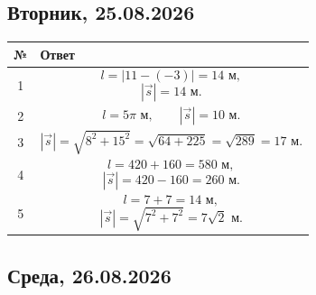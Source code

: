 \documentclass[a4paper,12pt]{article}
\begin{document}

\subsection*{\textcolor{darkaccent}{Вторник, 25.08.2026}}

\begin{center}
\renewcommand{\arraystretch}{1.35}

\begin{tabularx}{\linewidth}{@{}cX@{}}
\toprule
№ & Ответ\\
\midrule

1 &
\[
l=
|11-(-3)|
=
14\text{ м},
\]
\[
|\vec{s}|=14\text{ м}.
\]
\\

2 &
\[
l=5\pi\text{ м},
\qquad
|\vec{s}|=10\text{ м}.
\]
\\

3 &
\[
|\vec{s}|
=
\sqrt{8^2+15^2}
=
\sqrt{64+225}
=
\sqrt{289}
=
17\text{ м}.
\]
\\

4 &
\[
l=420+160=580\text{ м},
\]
\[
|\vec{s}|=420-160=260\text{ м}.
\]
\\

5 &
\[
l=7+7=14\text{ м},
\]
\[
|\vec{s}|
=
\sqrt{7^2+7^2}
=
7\sqrt{2}\text{ м}.
\]
\\

\bottomrule
\end{tabularx}
\end{center}


\subsection*{\textcolor{darkaccent}{Среда, 26.08.2026}}
\end{document}
